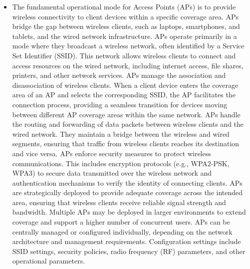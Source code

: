 \documentclass{article}
\begin{document}
\begin{itemize}
	\item[] The fundamental operational mode for Access Points (APs) is to provide wireless connectivity to client devices within a specific coverage area. APs bridge the gap between wireless clients, such as laptops, smartphones, and tablets, and the wired network infrastructure. APs operate primarily in a mode where they broadcast a wireless network, often identified by a Service Set Identifier (SSID). This network allows wireless clients to connect and access resources on the wired network, including internet access, file shares, printers, and other network services. APs manage the association and disassociation of wireless clients. When a client device enters the coverage area of an AP and selects the corresponding SSID, the AP facilitates the connection process, providing a seamless transition for devices moving between different AP coverage areas within the same network. APs handle the routing and forwarding of data packets between wireless clients and the wired network. They maintain a bridge between the wireless and wired segments, ensuring that traffic from wireless clients reaches its destination and vice versa. APs enforce security measures to protect wireless communications. This includes encryption protocols (e.g., WPA2-PSK, WPA3) to secure data transmitted over the wireless network and authentication mechanisms to verify the identity of connecting clients. APs are strategically deployed to provide adequate coverage across the intended area, ensuring that wireless clients receive reliable signal strength and bandwidth. Multiple APs may be deployed in larger environments to extend coverage and support a higher number of concurrent users. APs can be centrally managed or configured individually, depending on the network architecture and management requirements. Configuration settings include SSID settings, security policies, radio frequency (RF) parameters, and other operational parameters. 

\end{itemize}
\end{document}
